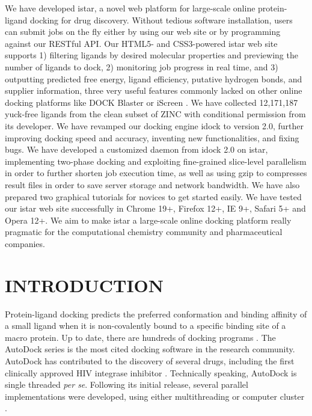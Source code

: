 \documentclass[12pt]{article}
\begin{document}
We have developed istar, a novel web platform for large-scale online protein-ligand docking for drug discovery. Without tedious software installation, users can submit jobs on the fly either by using our web site or by programming against our RESTful API. Our HTML5- and CSS3-powered istar web site supports 1) filtering ligands by desired molecular properties and previewing the number of ligands to dock, 2) monitoring job progress in real time, and 3) outputting predicted free energy, ligand efficiency, putative hydrogen bonds, and supplier information, three very useful features commonly lacked on other online docking platforms like DOCK Blaster \citep{557} or iScreen \citep{899}. We have collected 12,171,187 yuck-free ligands from the clean subset of ZINC \citep{532,1178} with conditional permission from its developer. We have revamped our docking engine idock \citep{1153} to version 2.0, further improving docking speed and accuracy, inventing new functionalities, and fixing bugs. We have developed a customized daemon from idock 2.0 on istar, implementing two-phase docking and exploiting fine-grained slice-level parallelism in order to further shorten job execution time, as well as using gzip to compresses result files in order to save server storage and network bandwidth. We have also prepared two graphical tutorials for novices to get started easily. We have tested our istar web site successfully in Chrome 19+, Firefox 12+, IE 9+, Safari 5+ and Opera 12+. We aim to make istar a large-scale online docking platform really pragmatic for the computational chemistry community and pharmaceutical companies.

\section*{\sffamily \Large INTRODUCTION} %

Protein-ligand docking predicts the preferred conformation and binding affinity of a small ligand when it is non-covalently bound to a specific binding site of a macro protein. Up to date, there are hundreds of docking programs \citep{493,922}. The AutoDock series is the most cited docking software in the research community. AutoDock has contributed to the discovery of several drugs, including the first clinically approved HIV integrase inhibitor \citep{1169}. Technically speaking, AutoDock is single threaded \textit{per se}. Following its initial release, several parallel implementations were developed, using either multithreading or computer cluster \citep{115,560,782}.
\end{document}

